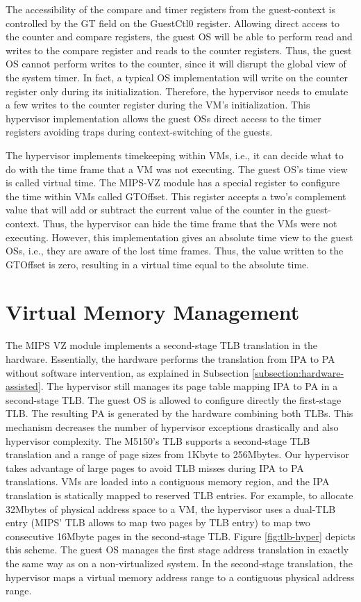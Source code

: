 The accessibility of the compare and timer registers from the guest-context is controlled by the GT field on the GuestCtl0 register. Allowing direct access to the counter and compare registers, the guest OS will be able to perform read and writes to the compare register and reads to the counter registers. Thus, the guest OS cannot perform writes to the counter, since it will disrupt the global view of the system timer. In fact, a typical OS implementation will write on the counter register only during its initialization. Therefore, the hypervisor needs to emulate a few writes to the counter register during the VM's initialization. This hypervisor implementation allows the guest OSs direct access to the timer registers avoiding traps during context-switching of the guests. 

The hypervisor implements timekeeping within VMs, i.e., it can decide what to do with the time frame that a VM was not executing. The guest OS's time view is called virtual time. The MIPS-VZ module has a special register to configure the time within VMs called GTOffset. This register accepts a two's complement value that will add or subtract the current value of the counter in the guest-context. Thus, the hypervisor can hide the time frame that the VMs were not executing. However, this implementation gives an absolute time view to the guest OSs, i.e., they are aware of the lost time frames. Thus, the value written to the GTOffset is zero, resulting in a virtual time equal to the absolute time. 




\section{Virtual Memory Management}
\label{section5:vmm}


The MIPS VZ module implements a second-stage TLB translation in the hardware. Essentially, the hardware performs the translation from IPA to PA without software intervention, as explained in Subsection \ref{subsection:hardware-assisted}.  The hypervisor still manages its page table mapping IPA to PA in a second-stage TLB. The guest OS is allowed to configure directly the first-stage TLB. The resulting PA is generated by the hardware combining both TLBs. This mechanism decreases the number of hypervisor exceptions drastically and also hypervisor complexity. The M5150's TLB supports a second-stage TLB translation and a range of page sizes from 1Kbyte to 256Mbytes. Our hypervisor takes advantage of large pages to avoid TLB misses during IPA to PA translations. VMs are loaded into a contiguous memory region, and the IPA translation is statically mapped to reserved TLB entries. For example, to allocate 32Mbytes of physical address space to a VM, the hypervisor uses a dual-TLB entry (MIPS' TLB allows to map two pages by TLB entry) to map two consecutive 16Mbyte pages in the second-stage TLB. Figure \ref{fig:tlb-hyper} depicts this scheme. The guest OS manages the first stage address translation in exactly the same way as on a non-virtualized system. In the second-stage translation, the hypervisor maps a virtual memory address range to a contiguous physical address range.

